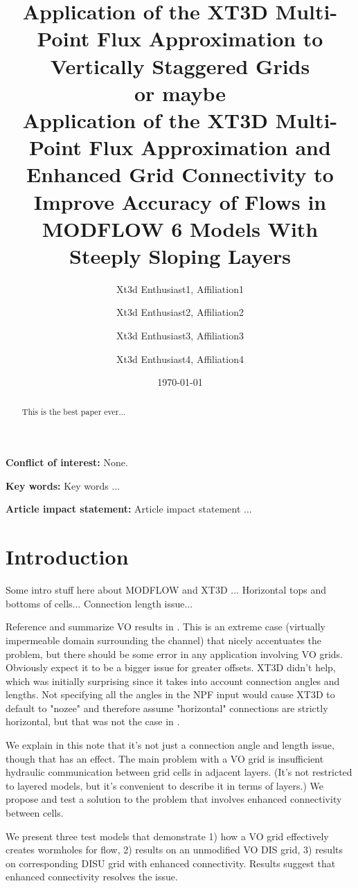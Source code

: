 \documentclass{article}
\title{Application of the XT3D Multi-Point Flux Approximation to Vertically Staggered Grids \\
	\normalsize or maybe \\
	\LARGE Application of the XT3D Multi-Point Flux Approximation and Enhanced Grid Connectivity to Improve Accuracy of Flows in MODFLOW 6 Models With Steeply Sloping Layers}
\author{
	Xt3d Enthusiast1, Affiliation1  \\
	\and 
	Xt3d Enthusiast2, Affiliation2 \\
	\and 
	Xt3d Enthusiast3, Affiliation3 \\
	\and 
	Xt3d Enthusiast4, Affiliation4 \\
	}
\date{\today}
\begin{document}
\maketitle

\textbf{Conflict of interest:} None.

\textbf{Key words:} Key words ...

\textbf{Article impact statement:} Article impact statement ...

\begin{abstract}
This is the best paper ever...
\end{abstract}

\section{Introduction}

Some intro stuff here about MODFLOW \citep{modflow6framework, modflow6gwf, modflow6gwt} and XT3D \citep{modflow6xt3d}... Horizontal tops and bottoms of cells... Connection length issue...

Reference and summarize VO results in \cite{bardot2022}. This is an extreme case (virtually impermeable domain surrounding the channel) that nicely accentuates the problem, but there should be some error in any application involving VO grids. Obviously expect it to be a bigger issue for greater offsets. XT3D didn't help, which was initially surprising since it takes into account connection angles and lengths. Not specifying all the angles in the NPF input would cause XT3D to default to "nozee" and therefore assume "horizontal" connections are strictly horizontal, but that was not the case in \cite{bardot2022}.

We explain in this note that it's not just a connection angle and length issue, though that has an effect.  The main problem with a VO grid is insufficient hydraulic communication between grid cells in adjacent layers. (It's not restricted to layered models, but it's convenient to describe it in terms of layers.)  We propose and test a solution to the problem that involves enhanced connectivity between cells.

We present three test models that demonstrate 1) how a VO grid effectively creates wormholes for flow, 2) results on an unmodified VO DIS grid, 3) results on corresponding DISU grid with enhanced connectivity. Results suggest that enhanced connectivity resolves the issue.

\end{document}
